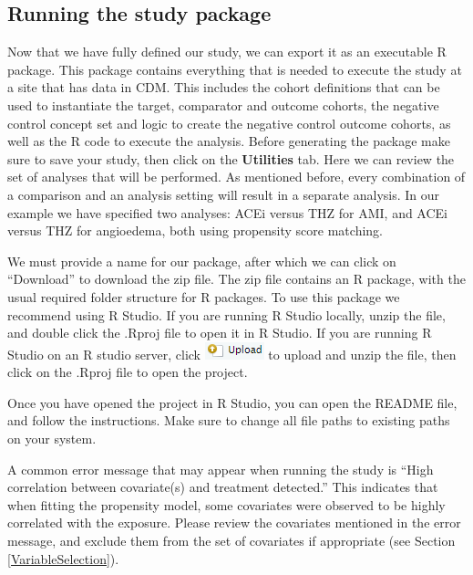 \documentclass[11pt]{book}
\theoremstyle{definition}
\theoremstyle{definition}
\theoremstyle{definition}
\theoremstyle{remark}
\begin{document}
\hypertarget{running-the-study-package}{%
\subsection{Running the study package}\label{running-the-study-package}}

Now that we have fully defined our study, we can export it as an executable R package. This package contains everything that is needed to execute the study at a site that has data in CDM. This includes the cohort definitions that can be used to instantiate the target, comparator and outcome cohorts, the negative control concept set and logic to create the negative control outcome cohorts, as well as the R code to execute the analysis. Before generating the package make sure to save your study, then click on the \textbf{Utilities} tab. Here we can review the set of analyses that will be performed. As mentioned before, every combination of a comparison and an analysis setting will result in a separate analysis. In our example we have specified two analyses: ACEi versus THZ for AMI, and ACEi versus THZ for angioedema, both using propensity score matching.

We must provide a name for our package, after which we can click on ``Download'' to download the zip file. The zip file contains an R package, with the usual required folder structure for R packages. \citep{Wickham_2015} To use this package we recommend using R Studio. If you are running R Studio locally, unzip the file, and double click the .Rproj file to open it in R Studio. If you are running R Studio on an R studio server, click \includegraphics{images/PopulationLevelEstimation/upload.png} to upload and unzip the file, then click on the .Rproj file to open the project.

Once you have opened the project in R Studio, you can open the README file, and follow the instructions. Make sure to change all file paths to existing paths on your system.

A common error message that may appear when running the study is ``High correlation between covariate(s) and treatment detected.'' This indicates that when fitting the propensity model, some covariates were observed to be highly correlated with the exposure. Please review the covariates mentioned in the error message, and exclude them from the set of covariates if appropriate (see Section \ref{VariableSelection}). 
\end{document}
